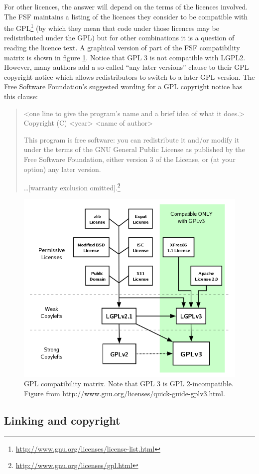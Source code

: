 \documentclass[a4paper,12pt]{article}
\begin{document}
For other licences, the answer will depend on the terms of the licences
involved. The FSF maintains a listing of the licences they consider to be
compatible with the GPL\footnote{\url{http://www.gnu.org/licenses/license-list.html}} (by which they mean that code under those licences
may be redistributed under the GPL) but for other combinations it is a
question of reading the licence text. A graphical version of part of the FSF
compatibility matrix is shown in figure \ref{fig:compatibility}. Notice that
GPL 3 is not compatible with LGPL2. However, many authors add a
so-called ``any later versions'' clause to their GPL copyright notice which
allows redistributors to switch to a later GPL version. The Free Software
Foundation's suggested wording for a GPL copyright notice has this clause:
\begin{quotation}
  <one line to give the program's name and a brief idea of what it does.>
    Copyright (C) <year>  <name of author>

    This program is free software: you can redistribute it and/or modify
    it under the terms of the GNU General Public License as published by
    the Free Software Foundation, either version 3 of the License, or
    (at your option) any later version.

    \ldots [warranty exclusion omitted].\footnote{\url{http://www.gnu.org/licenses/gpl.html}}
\end{quotation}

\begin{figure}[ht]
  \centering
  \includegraphics[width=.6\textwidth]{compatibility.png}
  \caption{GPL compatibility matrix. Note that GPL 3 is
    GPL 2-incompatible. Figure from \url{http://www.gnu.org/licenses/quick-guide-gplv3.html}.}
  \label{fig:compatibility}
\end{figure}

\subsection{Linking and copyright}
\end{document}
